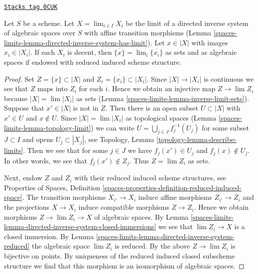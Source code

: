 \begin{lemma}
\label{spaces-limits-lemma-inverse-limit-irreducibles}
\href{https://stacks.math.columbia.edu/tag/0CUK}{\texttt{Stacks tag 0CUK}}

Let $S$ be a scheme. Let $X = \lim_{i \in I} X_i$ be the limit of a directed
inverse system of algebraic spaces over $S$ with affine transition morphisms
(Lemma \ref{spaces-limits-lemma-directed-inverse-system-has-limit}).
Let $x \in |X|$ with images $x_i \in |X_i|$. If each $X_i$ is decent,
then $\overline{\{x\}} = \lim_i \overline{\{x_i\}}$ as sets
and as algebraic spaces if endowed with reduced induced scheme structure.
\end{lemma}

\begin{proof}
Set $Z = \overline{\{x\}} \subset |X|$ and
$Z_i = \overline{\{x_i\}} \subset |X_i|$.
Since $|X| \to |X_i|$ is continuous we see that $Z$ maps into $Z_i$
for each $i$. Hence we obtain an injective map $Z \to \lim Z_i$
because $|X| = \lim |X_i|$ as sets (Lemma \ref{spaces-limits-lemma-inverse-limit-sets}).
Suppose that $x' \in |X|$ is not in $Z$.
Then there is an open subset $U \subset |X|$ with $x' \in U$
and $x \not \in U$. Since
$|X| = \lim |X_i|$ as topological spaces (Lemma \ref{spaces-limits-lemma-topology-limit})
we can write $U = \bigcup_{j \in J} f_j^{-1}(U_j)$
for some subset $J \subset I$ and opens $U_j \subset |X_j|$, see
Topology, Lemma \ref{topology-lemma-describe-limits}.
Then we see that for some $j \in J$ we have $f_j(x') \in U_j$
and $f_j(x) \not \in U_j$. In other words, we see that $f_j(x') \not \in Z_j$.
Thus $Z = \lim Z_i$ as sets.

\medskip\noindent
Next, endow $Z$ and $Z_i$ with their reduced induced scheme structures, see
Properties of Spaces, Definition
\ref{spaces-properties-definition-reduced-induced-space}.
The transition morphisms $X_{i'} \to X_i$ induce affine
morphisms $Z_{i'} \to Z_i$ and the projections $X \to X_i$
induce compatible morphisms $Z \to Z_i$.
Hence we obtain morphisms $Z \to \lim Z_i \to X$ of algebraic spaces.
By Lemma \ref{spaces-limits-lemma-directed-inverse-system-closed-immersions}
we see that $\lim Z_i \to X$ is a
closed immersion. By Lemma \ref{spaces-limits-lemma-directed-inverse-system-reduced}
the algebraic space $\lim Z_i$ is reduced.
By the above $Z \to \lim Z_i$ is bijective on points.
By uniqueness of the reduced induced closed subscheme structure
we find that this morphism is an isomorphism of algebraic spaces.
\end{proof}

